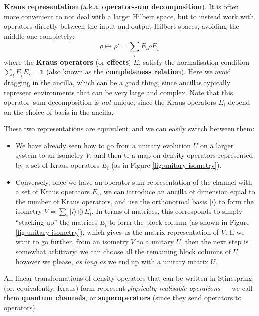 \documentclass[fleqn,a4paper]{article}
\providecommand{\tightlist}{\setlength{\itemsep}{0pt}\setlength{\parskip}{0pt}}
\newenvironment{idea}{\everypar{\setlength{\parindent}{1.5em}}}{}
\theoremstyle{definition}
\theoremstyle{definition}
\theoremstyle{definition}
\theoremstyle{definition}
\theoremstyle{remark}
\begin{document}
\begin{idea}
\textbf{Kraus representation} (a.k.a. \textbf{operator-sum decomposition}).
It is often more convenient to not deal with a larger Hilbert space, but to instead work with operators directly between the input and output Hilbert spaces, avoiding the middle one completely:
\[
  \rho \longmapsto \rho'= \sum_i E_i\rho E_i^\dagger
\]
where the \textbf{Kraus operators} (or \textbf{effects}) \(E_i\) satisfy the normalisation condition \(\sum_i E^\dagger_iE_i=\mathbf{1}\) (also known as the \textbf{completeness relation}).
Here we avoid dragging in the ancilla, which can be a good thing, since ancillas typically represent environments that can be very large and complex.
Note that this operator--sum decomposition is \emph{not} unique, since the Kraus operators \(E_i\) depend on the choice of basis in the ancilla.

\end{idea}

These two representations are equivalent, and we can easily switch between them:

\begin{itemize}
\tightlist
\item
  We have already seen how to go from a unitary evolution \(U\) on a larger system to an isometry \(V\), and then to a map on density operators represented by a set of Kraus operators \(E_i\) (as in Figure \ref{fig:unitary-isometry}).
\item
  Conversely, once we have an operator-sum representation of the channel with a set of Kraus operators \(E_i\), we can introduce an ancilla of dimension equal to the number of Kraus operators, and use the orthonormal basis \(|i\rangle\) to form the isometry \(V=\sum_i|i\rangle\otimes E_i\).
  In terms of matrices, this corresponds to simply ``stacking up'' the matrices \(E_i\) to form the block column (as shown in Figure \ref{fig:unitary-isometry}), which gives us the matrix representation of \(V\).
  If we want to go further, from an isometry \(V\) to a unitary \(U\), then the next step is somewhat arbitrary: we can choose all the remaining block columns of \(U\) however we please, \emph{as long as} we end up with a unitary matrix \(U\).
\end{itemize}

\begin{idea}
All linear transformations of density operators that can be written in Stinespring (or, equivalently, Kraus) form represent \emph{physically realisable operations} --- we call them \textbf{quantum channels}, or \textbf{superoperators} (since they send operators to operators).

\end{idea}
\end{document}
